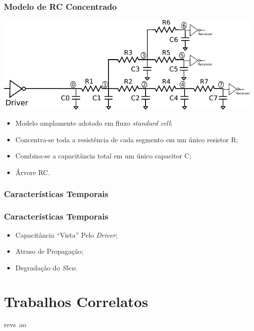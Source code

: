 \documentclass[10pt,a4paper]{beamer}
\begin{document}
				\begin{frame}
					\frametitle{Modelo de RC Concentrado}
					\begin{center}
						\includegraphics[width=\textwidth]{img/lumped_rc.pdf} 
					\end{center}
					\begin{itemize}
						\item Modelo amplamente adotado em fluxo \textit{standard cell};
						\item Concentra-se toda a resistência de cada segmento  em um único resistor R;
						\item Combina-se a capacitância total em um único capacitor C;
						\item Árvore RC.
					\end{itemize}								
				\end{frame}
			
			\subsubsection*{Características Temporais}
			\begin{frame}
				\frametitle{Características Temporais}
				
				\begin{itemize}
					\item Capacitância ``Vista'' Pelo \textit{Driver};
					\item Atraso de Propagação;
					\item Degradação do \textit{Slew}. 
					
				\end{itemize}
			\end{frame}
	
	\section{Trabalhos Correlatos}
	
		\begin{frame}
		revs~ao
		\end{frame}
	
\end{document}
